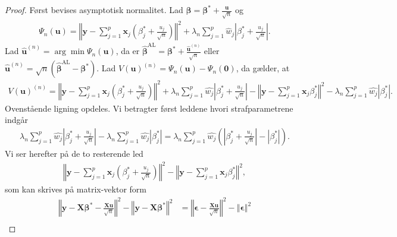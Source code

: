 \begin{proof}
Først bevises asymptotisk normalitet. Lad $\boldsymbol{\beta}=\boldsymbol{\beta}^{*} +\frac{\textbf{u}}{\sqrt{n}}$ og
\begin{align*}
\Psi_n(\textbf{u})=\left\Vert \mathbf{y}-\sum_{j=1}^p \textbf{x}_j \left( \beta_j^{*} +\frac{u_j}{\sqrt{n}} \right) \right\Vert^2 + \lambda_n \sum_{j=1}^p \hat{w}_j \left\vert \beta_j^{*} + \frac{u_j}{\sqrt{n}} \right\vert.
\end{align*}
Lad $\hat{\textbf{u}}^{(n)}=\arg \min \Psi_n(\textbf{u})$, da er $\hat{\boldsymbol{\beta}}^{{\text{AL}}}=\boldsymbol{\beta}^{*} + \frac{\hat{\boldsymbol{u}}^{(n)}}{\sqrt{n}}$ eller $\hat{\boldsymbol{u}}^{(n)}=\sqrt{n}\left(\hat{\boldsymbol{\beta}}^{\text{AL}}-\boldsymbol{\beta}^{*}\right)$.
Lad $V(\mathbf{u})^{(n)}=\Psi_n(\textbf{u}) - \Psi_n(\textbf{0})$, da gælder, at
\begin{align*}
V(\mathbf{u})^{(n)}= \left\Vert \textbf{y} - \sum_{j=1}^p \textbf{x}_j \left( \beta_j^{*} + \frac{u_j}{\sqrt{n}} \right) \right\Vert^2 +
\lambda_n \sum_{j=1}^p \hat{w_j} \left\vert \beta_j^{*} + \frac{u_j}{\sqrt{n}} \right\vert 
-
\left\Vert \textbf{y} - \sum_{j=1}^p \textbf{x}_j \beta_j^{*} \right\Vert^2 - \lambda_n \sum_{j=1}^p \hat{w_j} \left\vert \beta_j^{*} \right\vert.
\end{align*}
Ovenstående ligning opdeles.
Vi betragter først leddene hvori strafparametrene indgår
\begin{align*}
\lambda_n \sum_{j=1}^p \hat{w_j} \left\vert \beta_j^{*} + \frac{u_j}{\sqrt{n}} \right\vert- \lambda_n \sum_{j=1}^p \hat{w_j} \left\vert \beta_j^{*} \right\vert 
= \lambda_n \sum_{j=1}^p \hat{w_j} \left( \left\vert \beta_j^{*} + \frac{u_j}{\sqrt{n}} \right\vert - \left\vert \beta_j^{*} \right\vert
\right).
\end{align*}
Vi ser herefter på de to resterende led
\begin{align*}
\left\Vert \textbf{y} - \sum_{j=1}^p \textbf{x}_j \left( \beta_j^{*} + \frac{u_j}{\sqrt{n}} \right) \right\Vert^2 -\left\Vert \textbf{y} - \sum_{j=1}^p \textbf{x}_j \beta_j^{*} \right\Vert^2,
\end{align*}
som kan skrives på matrix-vektor form
\begin{align*}
\left\Vert \textbf{y}-\textbf{X}\boldsymbol{\beta}^{*} -\frac{\textbf{X}\textbf{u}}{\sqrt{n}} \right\Vert^2 - \left\Vert \textbf{y} - \textbf{X} \boldsymbol{\beta}^{*} \right\Vert^2  & =
\left\Vert \boldsymbol{\epsilon} - \frac{\textbf{X}\textbf{u}}{\sqrt{n}} \right\Vert^2 - \left\Vert \boldsymbol{\epsilon} \right\Vert^2  \\

\end{align*}
\end{proof}
